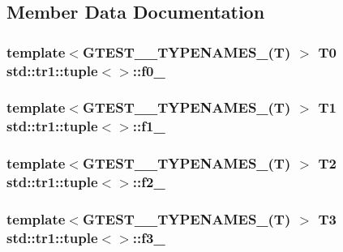 \subsection{Member Data Documentation}
\hypertarget{singletonstd_1_1tr1_1_1tuple_a771b1d99e8800fb284acd04bca838cbb}{
\subsubsection[{f0\+\_\+}]{\setlength{\rightskip}{0pt plus 5cm}template$<$G\+T\+E\+S\+T\+\_\+\_\+\+T\+Y\+P\+E\+N\+A\+M\+E\+S\+\_\+(\+T) $>$ T0 {\bf std\+::tr1\+::tuple}$<$$>$\+::f0\+\_\+}}\label{singletonstd_1_1tr1_1_1tuple_a771b1d99e8800fb284acd04bca838cbb}
\hypertarget{singletonstd_1_1tr1_1_1tuple_a7cccf899dedc626c51fa4f6921d0ac52}{
\subsubsection[{f1\+\_\+}]{\setlength{\rightskip}{0pt plus 5cm}template$<$G\+T\+E\+S\+T\+\_\+\_\+\+T\+Y\+P\+E\+N\+A\+M\+E\+S\+\_\+(\+T) $>$ T1 {\bf std\+::tr1\+::tuple}$<$$>$\+::f1\+\_\+}}\label{singletonstd_1_1tr1_1_1tuple_a7cccf899dedc626c51fa4f6921d0ac52}
\hypertarget{singletonstd_1_1tr1_1_1tuple_aaec06c27366502dc332ef96878628f84}{
\subsubsection[{f2\+\_\+}]{\setlength{\rightskip}{0pt plus 5cm}template$<$G\+T\+E\+S\+T\+\_\+\_\+\+T\+Y\+P\+E\+N\+A\+M\+E\+S\+\_\+(\+T) $>$ T2 {\bf std\+::tr1\+::tuple}$<$$>$\+::f2\+\_\+}}\label{singletonstd_1_1tr1_1_1tuple_aaec06c27366502dc332ef96878628f84}
\hypertarget{singletonstd_1_1tr1_1_1tuple_ad4d3673e0d5c07c392c02e335fe978ff}{
\subsubsection[{f3\+\_\+}]{\setlength{\rightskip}{0pt plus 5cm}template$<$G\+T\+E\+S\+T\+\_\+\_\+\+T\+Y\+P\+E\+N\+A\+M\+E\+S\+\_\+(\+T) $>$ T3 {\bf std\+::tr1\+::tuple}$<$$>$\+::f3\+\_\+}}\label{singletonstd_1_1tr1_1_1tuple_ad4d3673e0d5c07c392c02e335fe978ff}
